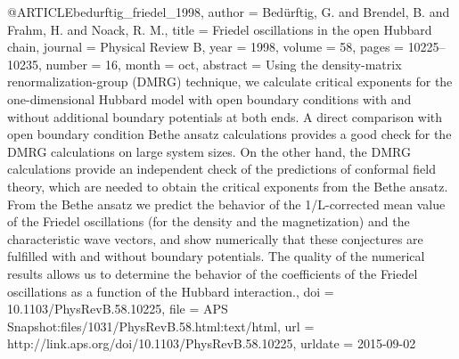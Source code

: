 @ARTICLE{bedurftig_friedel_1998,
  author = {Bedürftig, G. and Brendel, B. and Frahm, H. and Noack, R. M.},
  title = {Friedel oscillations in the open {Hubbard} chain},
  journal = {Physical Review B},
  year = {1998},
  volume = {58},
  pages = {10225--10235},
  number = {16},
  month = oct,
  abstract = {Using the density-matrix renormalization-group (DMRG) technique, we
	calculate critical exponents for the one-dimensional Hubbard model
	with open boundary conditions with and without additional boundary
	potentials at both ends. A direct comparison with open boundary condition
	Bethe ansatz calculations provides a good check for the DMRG calculations
	on large system sizes. On the other hand, the DMRG calculations provide
	an independent check of the predictions of conformal field theory,
	which are needed to obtain the critical exponents from the Bethe
	ansatz. From the Bethe ansatz we predict the behavior of the 1/L-corrected
	mean value of the Friedel oscillations (for the density and the magnetization)
	and the characteristic wave vectors, and show numerically that these
	conjectures are fulfilled with and without boundary potentials. The
	quality of the numerical results allows us to determine the behavior
	of the coefficients of the Friedel oscillations as a function of
	the Hubbard interaction.},
  doi = {10.1103/PhysRevB.58.10225},
  file = {APS Snapshot:files/1031/PhysRevB.58.html:text/html},
  url = {http://link.aps.org/doi/10.1103/PhysRevB.58.10225},
  urldate = {2015-09-02}
}

